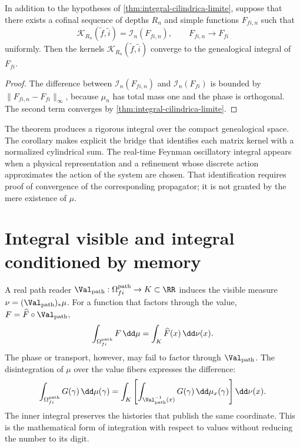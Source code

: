 \begin{corollary}
\label{cor:convergencia-kernels-discretos}
In addition to the hypotheses of
\cref{thm:integral-cilindrica-limite}, suppose that there exists a cofinal sequence
of depths \(R_n\) and simple functions \(F_{fi,n}\) such that
\[
 \mathcal K_{R_n}(\widetilde f,\widetilde i)
 =\mathcal I_n(F_{fi,n}),
 \qquad
 F_{fi,n}\longrightarrow F_{fi}
\]
uniformly. Then the kernels
\(\mathcal K_{R_n}(\widetilde f,\widetilde i)\) converge to the genealogical integral
of \(F_{fi}\).
\end{corollary}

\begin{proof}
The difference between \(\mathcal I_n(F_{fi,n})\) and
\(\mathcal I_n(F_{fi})\) is bounded by
\(\|F_{fi,n}-F_{fi}\|_\infty\), because \(\mu_n\) has total mass one and the
phase is orthogonal. The second term converges by
\cref{thm:integral-cilindrica-limite}.
\end{proof}

The theorem produces a rigorous integral over the compact genealogical space. The corollary makes explicit the bridge that identifies each matrix kernel with a normalized cylindrical sum. The real-time Feynman oscillatory integral appears when a physical representation and a refinement whose discrete action approximates the action of the system are chosen. That identification requires proof of convergence of the corresponding propagator; it is not granted by the mere existence of \(\mu\).

\section{Integral visible and integral conditioned by memory}

A real path reader \(\Val_{\rm path}:\Omega_{fi}^{\rm path}\to K\subset\RR\) induces the visible measure
\(\nu=(\Val_{\rm path})_*\mu\). For a function that factors through the value,
\(F=\widehat F\circ\Val_{\rm path}\),
\[
 \int_{\Omega_{fi}^{\rm path}}F\,\dd\mu
 =\int_K\widehat F(x)\,\dd\nu(x).
\]
The phase or transport, however, may fail to factor through
\(\Val_{\rm path}\). The disintegration of \(\mu\) over the value fibers
expresses the difference:
\begin{equation}
 \int_{\Omega_{fi}^{\rm path}}G(\gamma)\,\dd\mu(\gamma)
 =\int_K
   \left[
    \int_{\Val_{\rm path}^{-1}(x)}G(\gamma)\,\dd\mu_x(\gamma)
   \right]\dd\nu(x).
 \label{eq:desintegracion-caminos}
\end{equation}
The inner integral preserves the histories that publish the same coordinate.
This is the mathematical form of integration with respect to values without reducing the
number to its digit.

